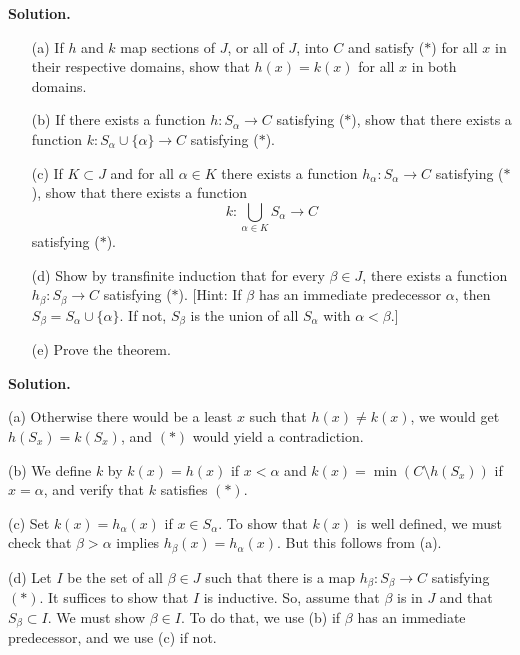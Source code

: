 \documentclass[12pt,letterpaper]{article}
\newcommand{\noi}{\noindent}%
\newcommand{\sm}{\setminus}
\begin{document}
\noi\textbf{Solution.}
\begin{enumerate}
\item[(a)] If $h$ and $k$ map sections of $J$, or all of $J$, into $C$ and satisfy ($\ast$) for all $x$ in their respective domains, show that $h(x) = k(x)$ for all $x$ in both domains.

\item[(b)] If there exists a function $h: S_\alpha \to C$ satisfying ($\ast$), show that there exists a function $k: S_\alpha \cup \{\alpha\} \to C$ satisfying ($\ast$).

\item[(c)] If $K \subset J$ and for all $\alpha \in K$ there exists a function $h_\alpha: S_\alpha \to C$ satisfying ($\ast$), show that there exists a function
\[k: \bigcup_{\alpha \in K} S_\alpha \to C\]
satisfying ($\ast$).

\item[(d)] Show by transfinite induction that for every $\beta \in J$, there exists a function $h_\beta: S_\beta \to C$ satisfying ($\ast$). [Hint: If $\beta$ has an immediate predecessor $\alpha$, then $S_\beta = S_\alpha \cup \{\alpha\}$. If not, $S_\beta$ is the union of all $S_\alpha$ with $\alpha < \beta$.]

\item[(e)] Prove the theorem.
\end{enumerate} 

\noi\textbf{Solution.} 

\noi(a) Otherwise there would be a least $x$ such that $h(x)\ne k(x)$, we would get $h(S_x)=k(S_x)$, and $(*)$ would yield a contradiction. 

\noi(b) We define $k$ by $k(x)=h(x)$ if $x<\alpha$ and $k(x)=\min(C\sm h(S_x))$ if $x=\alpha$, and verify that $k$ satisfies $(*)$. 

\noi(c) Set $k(x)=h_\alpha(x)$ if $x\in S_\alpha$. To show that $k(x)$ is well defined, we must check that $\beta>\alpha$ implies $h_\beta(x)=h_\alpha(x)$. But this follows from (a). 

\noi(d) Let $I$ be the set of all $\beta\in J$ such that there is a map $h_\beta:S_\beta\to C$ satisfying $(*)$. It suffices to show that $I$ is inductive. So, assume that $\beta$ is in $J$ and that $S_\beta\subset I$. We must show $\beta\in I$. To do that, we use (b) if $\beta$ has an immediate predecessor, and we use (c) if not. 
\end{document}
